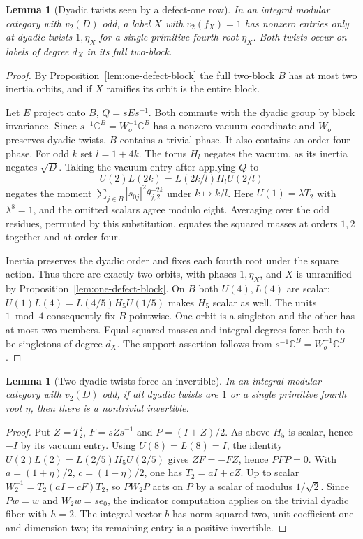 \documentclass[11pt,a4paper]{article}
\numberwithin{equation}{section}
\newtheorem{lemma}[theorem]{Lemma}
\theoremstyle{remark}
\begin{document}
\begin{lemma}[Dyadic twists seen by a defect-one row]\label{fam:M:7.5}\label{seq:dyadic-pair}
In an integral modular category with $v_2(D)$ odd, a label $X$
with $v_2(f_X)=1$ has nonzero entries only at dyadic twists
$1,\eta_X$ for a single primitive fourth root $\eta_X$.
Both twists occur on labels of degree $d_X$ in its full two-block.
\end{lemma}

\begin{proof}
By Proposition~\ref{lem:one-defect-block} the full two-block $B$ has at
most two inertia orbits, and if $X$ ramifies its orbit is the entire
block.

Let $E$ project onto $B$, $Q=sEs^{-1}$. Both commute with the dyadic group by block invariance. Since $s^{-1}\mathbb C^B=W_o^{-1}\mathbb C^B$ has a nonzero vacuum coordinate and $W_o$ preserves dyadic twists, $B$ contains a trivial phase. It also contains an order-four phase. For odd $k$ set $l=1+4k$. The torus $H_l$ negates the vacuum, as its inertia negates $\sqrt D$. Taking the vacuum entry after applying $Q$ to
\[
 U(2)L(2k)=L(2k/l)H_lU(2/l)
\]
negates the moment $\sum_{j\in B}|s_{0j}|^2\theta_{j,2}^{-2k}$ under $k\mapsto k/l$. Here $U(1)=\lambda T_2$ with $\lambda^8=1$, and the omitted scalars agree modulo eight. Averaging over the odd residues, permuted by this substitution, equates the squared masses at orders $1,2$ together and at order four.

Inertia preserves the dyadic order and fixes each fourth root under the square action. Thus there are exactly two orbits, with phases $1,\eta_X$, and $X$ is unramified by Proposition~\ref{lem:one-defect-block}. On $B$ both $U(4),L(4)$ are scalar; $U(1)L(4)=L(4/5)H_5U(1/5)$ makes $H_5$ scalar as well. The units $1\bmod4$ consequently fix $B$ pointwise. One orbit is a singleton and the other has at most two members. Equal squared masses and integral degrees force both to be singletons of degree $d_X$. The support assertion follows from $s^{-1}\mathbb C^B=W_o^{-1}\mathbb C^B$.
\end{proof}

\begin{lemma}[Two dyadic twists force an invertible]\label{fam:M:7.6}\label{seq:two-phase}
In an integral modular category with $v_2(D)$ odd, if all dyadic
twists are $1$ or a single primitive fourth root $\eta$, then there
is a nontrivial invertible.
\end{lemma}

\begin{proof}
Put $Z=T_2^2$, $F=sZs^{-1}$ and $P=(I+Z)/2$. As above $H_5$ is scalar, hence $-I$ by its vacuum entry. Using $U(8)=L(8)=I$, the identity $U(2)L(2)=L(2/5)H_5U(2/5)$ gives $ZF=-FZ$, hence $PFP=0$. With $a=(1+\eta)/2$, $c=(1-\eta)/2$, one has $T_2=aI+cZ$. Up to scalar $W_2^{-1}=T_2(aI+cF)T_2$, so $PW_2P$ acts on $P$ by a scalar of modulus $1/\sqrt2$. Since $Pw=w$ and $W_2w=se_0$, the indicator computation applies on the trivial dyadic fiber with $h=2$. The integral vector $b$ has norm squared two, unit coefficient one and dimension two; its remaining entry is a positive invertible.
\end{proof}
\end{document}
